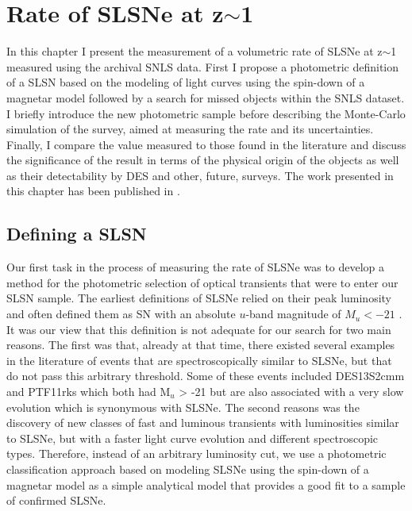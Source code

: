 \chapter{Rate of SLSNe at z$\sim$1}
\label{Chapter3}

In this chapter I present the measurement of a volumetric rate of SLSNe at z$\sim$1 measured using the archival SNLS data. First I propose a photometric definition of a SLSN based on the modeling of light curves using the spin-down of a magnetar model followed by a search for missed objects within the SNLS dataset. I briefly introduce the new photometric sample before describing the Monte-Carlo simulation of the survey, aimed at measuring the rate and its uncertainties. Finally, I compare the value measured to those found in the literature and discuss the significance of the result in terms of the physical origin of the objects as well as their detectability by DES and other, future, surveys. The work presented in this chapter has been published in \citet{Prajs2016}.

\section{Defining a SLSN}
\label{sec:SLSNDefinition}
Our first task in the process of measuring the rate of SLSNe was to develop a method for the photometric selection of optical transients that were to enter our SLSN sample. The earliest definitions of SLSNe relied on their peak luminosity and often defined them as SN with an absolute $u$-band magnitude of $M_{u}<-21$ \citep{2012Sci...337..927G}. It was our view that this definition is not adequate for our search for two main reasons. The first was that, already at that time, there existed several examples in the literature of events that are spectroscopically similar to SLSNe, but that do not pass this arbitrary threshold. Some of these events included DES13S2cmm \citep{2015MNRAS.449.1215P} and PTF11rks \citep{2013ApJ...770..128I} which both had M$_u$ > -21 but are also associated with a very slow evolution which is synonymous with SLSNe. The second reasons was the discovery of new classes of fast and luminous transients \citep{2016ApJ...819...35A} with luminosities similar to SLSNe, but with a faster light curve evolution and different spectroscopic types. Therefore, instead of an arbitrary luminosity cut, we use a photometric classification approach based on modeling SLSNe using the spin-down of a magnetar model as a simple analytical model that provides a good fit to a sample of confirmed SLSNe.

